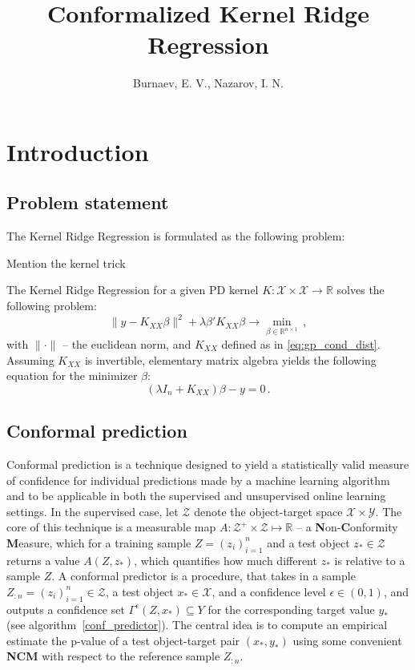 \documentclass[a4paper,14pt]{article}
\title{Conformalized Kernel Ridge Regression}
\author{Burnaev, E. V., Nazarov, I. N.}
\newcommand{\Xcal}{\mathcal{X}}
\newcommand{\Ycal}{\mathcal{Y}}
\newcommand{\Zcal}{\mathcal{Z}}
\newcommand{\Real}{\mathbb{R}}
\begin{document}
\maketitle
\tableofcontents
\clearpage

\section{Introduction} %
\label{sec:introduction}

\subsection{Problem statement} %
\label{sub:problem_statement}

The Kernel Ridge Regression is formulated as the following problem:
$$ $$

Mention the kernel trick

The Kernel Ridge Regression for a given PD kernel $K:\Xcal\times \Xcal \to \Real$
solves the following problem:
$$ \|y - K_{XX}\beta\|^2 + \lambda \beta' K_{XX} \beta
  \to \min_{\beta\in \Real^{n\times 1}}
  \,, $$
with $\|\cdot\|$ -- the euclidean norm, and $K_{XX}$ defined as in \ref{eq:gp_cond_dist}.
Assuming $K_{XX}$ is invertible, elementary matrix algebra yields the following
equation for the minimizer $\beta$:
$$ (\lambda I_n + K_{XX}) \beta - y = 0 \,. $$


\subsection{Conformal prediction} %
\label{sub:conformal_prediction}

Conformal prediction is a technique designed to yield a statistically valid measure
of confidence for individual predictions made by a machine learning algorithm and
to be applicable in both the supervised and unsupervised online learning settings.
In the supervised case, let $\Zcal$ denote the object-target space $\Xcal \times \Ycal$.
The core of this technique is a measurable map $A: \Zcal^+\times \Zcal \mapsto \Real$
-- a \textbf{N}on-\textbf{C}onformity \textbf{M}easure, which for a training sample
$Z = (z_i)_{i=1}^n$ and a test object $z_*\in \Zcal$ returns a value $A(Z, z_*)$,
which quantifies how much different $z_*$ is relative to a sample $Z$. A conformal
predictor is a procedure, that takes in a sample $Z_{:n}=(z_i)_{i=1}^n\in\Zcal$,
a test object $x_*\in\Xcal$, and a confidence level $\epsilon\in(0,1)$, and outputs
a confidence set $\Gamma^\epsilon(Z, x_*) \subseteq Y$ for the corresponding target
value $y_*$ (see algorithm~\ref{conf_predictor}). The central idea is to compute
an empirical estimate the p-value of a test object-target pair $(x_*, y_*)$ using
some convenient \textbf{NCM} with respect to the reference sample $Z_{:n}$.
\end{document}
